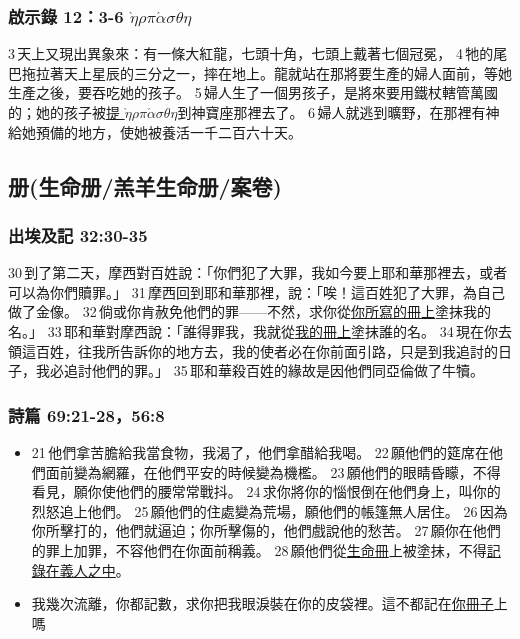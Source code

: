 \subsubsection{啟示錄 12：3-6 $\grave{\eta}$$\rho$$\pi$$\acute{\alpha}$$\sigma$$\theta$$\eta$}
3 天上又現出異象來：有一條大紅龍，七頭十角，七頭上戴著七個冠冕， 4 牠的尾巴拖拉著天上星辰的三分之一，摔在地上。龍就站在那將要生產的婦人面前，等她生產之後，要吞吃她的孩子。 5 婦人生了一個男孩子，是將來要用鐵杖轄管萬國的；她的孩子被\underline{提 $\grave{\eta}$$\rho$$\pi$$\acute{\alpha}$$\sigma$$\theta$$\eta$}到神寶座那裡去了。 6 婦人就逃到曠野，在那裡有神給她預備的地方，使她被養活一千二百六十天。




\subsection{册(生命册/羔羊生命册/案卷)}

\subsubsection{出埃及記 32:30-35}
30 到了第二天，摩西對百姓說：「你們犯了大罪，我如今要上耶和華那裡去，或者可以為你們贖罪。」 31 摩西回到耶和華那裡，說：「唉！這百姓犯了大罪，為自己做了金像。 32 倘或你肯赦免他們的罪——不然，求你從\underline{你所寫的冊上}塗抹我的名。」 33 耶和華對摩西說：「誰得罪我，我就從\underline{我的冊上}塗抹誰的名。 34 現在你去領這百姓，往我所告訴你的地方去，我的使者必在你前面引路，只是到我追討的日子，我必追討他們的罪。」 35 耶和華殺百姓的緣故是因他們同亞倫做了牛犢。

\subsubsection{詩篇 69:21-28，56:8}
\begin{itemize} 
\itemsep-.35em 
\item 21 他們拿苦膽給我當食物，我渴了，他們拿醋給我喝。
22 願他們的筵席在他們面前變為網羅，在他們平安的時候變為機檻。
23 願他們的眼睛昏矇，不得看見，願你使他們的腰常常戰抖。
24 求你將你的惱恨倒在他們身上，叫你的烈怒追上他們。
25 願他們的住處變為荒場，願他們的帳篷無人居住。
26 因為你所擊打的，他們就逼迫；你所擊傷的，他們戲說他的愁苦。
27 願你在他們的罪上加罪，不容他們在你面前稱義。
28 願他們從\underline{生命冊}上被塗抹，不得\underline{記錄在義人之中}。
\item 我幾次流離，你都記數，求你把我眼淚裝在你的皮袋裡。這不都記在\underline{你冊子}上嗎
\end{itemize}

